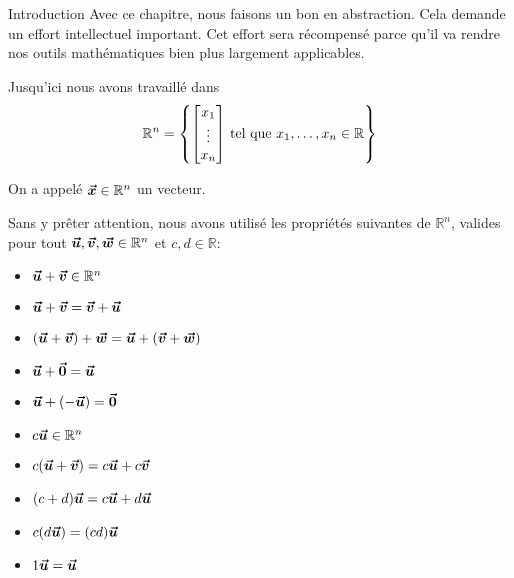 \documentclass[a4paper]{article}
\begin{document}
\begin{parag}{Introduction}
    Avec ce chapitre, nous faisons un bon en abstraction. Cela demande un effort intellectuel important. Cet effort sera récompensé parce qu'il va rendre nos outils mathématiques bien plus largement applicables.

    Jusqu'ici nous avons travaillé dans
    \[\mathbb{R}^{n} = \left\{\begin{bmatrix} x_1 \\ \vdots \\ x_n \end{bmatrix} \telque x_1, \ldots, x_n \in \mathbb{R}\right\}\]

    On a appelé $\bm{\protect\vec{x}} \in \mathbb{R}^{n}$ un vecteur.

    Sans y prêter attention, nous avons utilisé les propriétés suivantes de $\mathbb{R}^{n}$, valides pour tout $\bm{\protect\vec{u}}, \bm{\protect\vec{v}}, \bm{\protect\vec{w}} \in \mathbb{R}^{n}$ et $c, d \in \mathbb{R}$:

    \begin{center}
    \begin{minipage}{0.45\textwidth}
        \begin{itemize}[left=0pt]
        \item $\bm{\protect\vec{u}} + \bm{\protect\vec{v}} \in \mathbb{R}^{n}$
        \item $\bm{\protect\vec{u}} + \bm{\protect\vec{v}} = \bm{\protect\vec{v}} + \bm{\protect\vec{u}}$
        \item $\left(\bvec{u} + \bvec{v}\right) + \bvec{w} = \bvec{u} + \left(\bvec{v} + \bvec{w}\right)$
        \item $\bm{\protect\vec{u}} + \bm{\protect\vec{0}} = \bm{\protect\vec{u}}$
        \item $\bvec{u} + \left(-\bvec{u}\right) = \bvec{0}$
    \end{itemize}
    \end{minipage}
    \hfill
    \begin{minipage}{0.45\textwidth}
    \begin{itemize}[left=0pt]
        \item $c \bm{\protect\vec{u}} \in\mathbb{R}^{n}$
        \item $c\left(\bvec{u} + \bvec{v}\right) = c \bvec{u} + c \bvec{v}$
        \item $\left(c + d\right)\bvec{u} = c \bvec{u} + d \bvec{u}$
        \item $c\left(d \bvec{u}\right) = \left(cd\right)\bvec{u}$
        \item $1 \bm{\protect\vec{u}}= \bm{\protect\vec{u}}$
    \end{itemize}
    \end{minipage}
    \end{center}
\end{parag}
\end{document}
